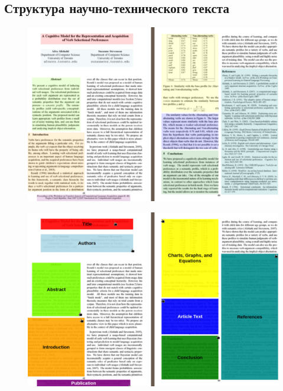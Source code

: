 \subsection{Структура научно-технического текста}





\cite{butenko2022}

\begin{figure}[H]
	\centering
	\includegraphics[width=\textwidth]{img/struct-parts.png}
	\caption{}
	\label{fig:}
\end{figure}

\begin{figure}[H]
	\centering
	\includegraphics[width=\textwidth]{img/struct-parts-named.png}
	\caption{}
	\label{fig:}
\end{figure}

